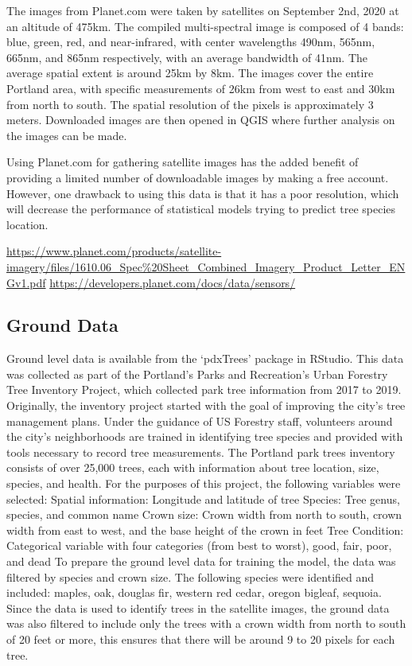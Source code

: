 \documentclass[12pt,twoside]{reedthesis}
\begin{document}
The images from Planet.com were taken by satellites on September 2nd, 2020 at an altitude of 475km. The compiled multi-spectral image is composed of 4 bands: blue, green, red, and near-infrared, with center wavelengths 490nm, 565nm, 665nm, and 865nm respectively, with an average bandwidth of 41nm. The average spatial extent is around 25km by 8km. The images cover the entire Portland area, with specific measurements of 26km from west to east and 30km from north to south. The spatial resolution of the pixels is approximately 3 meters.
Downloaded images are then opened in QGIS where further analysis on the images can be made.

Using Planet.com for gathering satellite images has the added benefit of providing a limited number of downloadable images by making a free account. However, one drawback to using this data is that it has a poor resolution, which will decrease the performance of statistical models trying to predict tree species location.

\url{https://www.planet.com/products/satellite-imagery/files/1610.06_Spec\%20Sheet_Combined_Imagery_Product_Letter_ENGv1.pdf}
\url{https://developers.planet.com/docs/data/sensors/}

\hypertarget{ground-data}{%
\subsection{Ground Data}\label{ground-data}}

Ground level data is available from the `pdxTrees' package in RStudio. This data was collected as part of the Portland's Parks and Recreation's Urban Forestry Tree Inventory Project, which collected park tree information from 2017 to 2019. Originally, the inventory project started with the goal of improving the city's tree management plans. Under the guidance of US Forestry staff, volunteers around the city's neighborhoods are trained in identifying tree species and provided with tools necessary to record tree measurements. The Portland park trees inventory consists of over 25,000 trees, each with information about tree location, size, species, and health. For the purposes of this project, the following variables were selected:
Spatial information: Longitude and latitude of tree
Species: Tree genus, species, and common name
Crown size: Crown width from north to south, crown width from east to west, and the base height of the crown in feet
Tree Condition: Categorical variable with four categories (from best to worst), good, fair, poor, and dead
To prepare the ground level data for training the model, the data was filtered by species and crown size. The following species were identified and included: maples, oak, douglas fir, western red cedar, oregon bigleaf, sequoia. Since the data is used to identify trees in the satellite images, the ground data was also filtered to include only the trees with a crown width from north to south of 20 feet or more, this ensures that there will be around 9 to 20 pixels for each tree.
\end{document}
